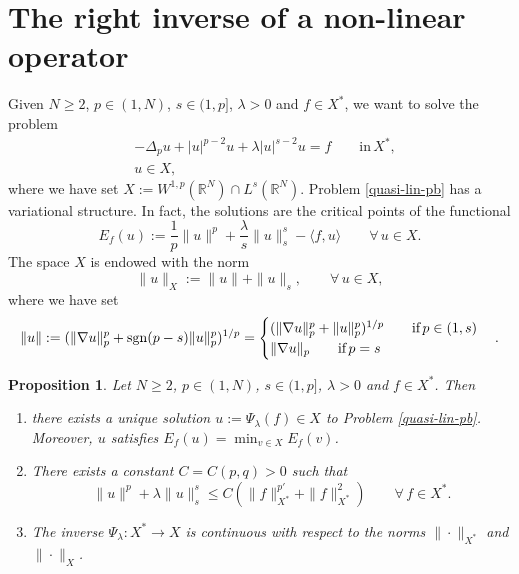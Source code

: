 \documentclass[11pt,reqno]{amsart}
\newtheorem{proposition}[theorem]{Proposition}
\theoremstyle{definition}
\numberwithin{equation}{section}
\numberwithin{theorem}{section}
\numberwithin{equation}{section}
\numberwithin{theorem}{section}
\newcommand{\R}{\mathbb{R}}
\begin{document}
\section{The right inverse of a non-linear operator}\label{sec-right-inv}
Given $N\ge 2$, $p\in(1,N)$, $s\in(1,p]$, %
$\lambda>0$ and $f\in X^*$, we want to solve the problem
\begin{equation}\label{quasi-lin-pb}
\begin{aligned}
&-\Delta_p u+|u|^{p-2}u+\lambda |u|^{s-2}u=f\qquad\text{in}\,X^* ,\\
& u\in X,
\end{aligned}    
\end{equation}
where we have set $X:=W^{1,p}(\R^N)\cap L^s(\R^N)$. Problem \eqref{quasi-lin-pb} has a variational structure. In fact, the solutions are the critical points of the functional 
$$E_f(u):=\frac{1}{p}\|u\|^p+\frac{\lambda}{s}\|u\|^s_s-\langle f,u\rangle\qquad\forall\,u\in X.$$
The space $X$ is endowed with the norm $$\|u\|_X:=\|u\|+\|u\|_s,\qquad\forall\, u\in X,$$
where we have set 
$$\|u\|:=(\|\nabla u\|_p^p+{\rm sgn}(p-s)\|u\|_p^p)^{1/p}=
\begin{cases}
(\|\nabla u\|^p_p+\|u\|_p^p)^{1/p}\qquad\text{if}\,p\in(1,s)\\
\|\nabla u\|_p\qquad\text{if}\,p=s
\end{cases}.$$
\begin{proposition}\label{prop-quasi-lin-pb}
Let $N\ge 2$, $p\in(1,N)$, $s\in(1,p]$, %
$\lambda>0$ and $f\in X^*$. Then
\begin{enumerate}
\item there exists a unique solution $u:=\Psi_\lambda(f)\in X$ to Problem \eqref{quasi-lin-pb}. Moreover, $u$ satisfies $E_f(u)=\min_{v\in X} E_f(v)$.
\item There exists a constant $C=C(p,q)>0$ such that 
\begin{equation}\label{est-inv}
\|u\|^p+\lambda\|u\|^s_s\le C (\|f\|_{X^*}^{p'}+\|f\|_{X^*}^2)\qquad\forall\,f\in X^*.
\end{equation}   
\item The inverse $\Psi_\lambda:X^*\to X$ is continuous with respect to the norms $\|\cdotp\|_{X^*}$ and $\|\cdotp\|_X$.
\end{enumerate}
\end{proposition}
\end{document}
